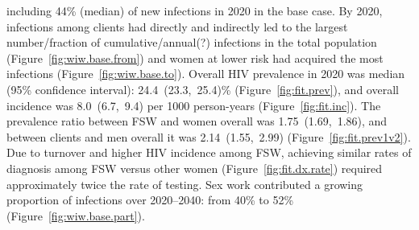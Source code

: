 including 44\% (median) of new infections in 2020 in the base case. %
By 2020, infections among clients had directly and indirectly led to the largest number/fraction
of cumulative/annual(?) infections in the total population (Figure~\ref{fig:wiw.base.from})
and women at lower risk had acquired the most infections (Figure~\ref{fig:wiw.base.to}).
Overall HIV prevalence in 2020 was median (95\% confidence interval):
24.4~(23.3,~25.4)\% (Figure~\ref{fig:fit.prev}), %
and overall incidence was 8.0~(6.7,~9.4) per 1000 person-years (Figure~\ref{fig:fit.inc}).
The prevalence ratio between FSW and women overall was 1.75~(1.69,~1.86), %
and between clients and men overall it was 2.14~(1.55,~2.99) %
(Figure~\ref{fig:fit.prev1v2}).
Due to turnover and higher HIV incidence among FSW,
achieving similar rates of diagnosis among FSW versus other women (Figure~\ref{fig:fit.dx.rate})
required approximately twice the rate of testing. %
Sex work contributed a growing proportion of infections
over 2020--2040: from 40\% to 52\% (Figure~\ref{fig:wiw.base.part}). %
